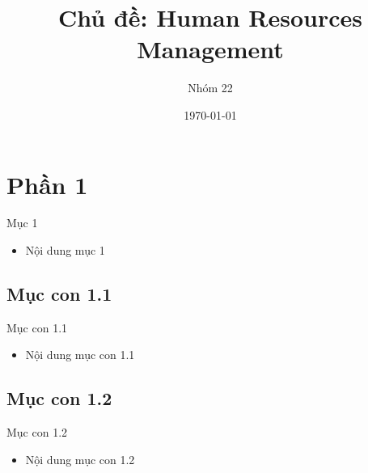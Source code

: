 \documentclass{beamer}
\title[{\makebox[.15\paperwidth]{Human Resources Management}}]{Chủ đề: Human Resources Management}
\author[Nhóm 22]{Nhóm 22
}
\date[Data Warehouse \& BI]{\today}
\begin{document}
\begin{frame}
\titlepage
\end{frame}
\frame{\tableofcontents}

\section{Phần 1}
\begin{frame}{Mục 1}
\begin{itemize}
\item Nội dung mục 1
\end{itemize}
\end{frame}

\subsection{Mục con 1.1}
\begin{frame}{Mục con 1.1}
\begin{itemize}
\item Nội dung mục con 1.1
\end{itemize}
\end{frame}

\subsection{Mục con 1.2}
\begin{frame}{Mục con 1.2}
\begin{itemize}
\item Nội dung mục con 1.2
\end{itemize}
\end{frame}
\end{document}
